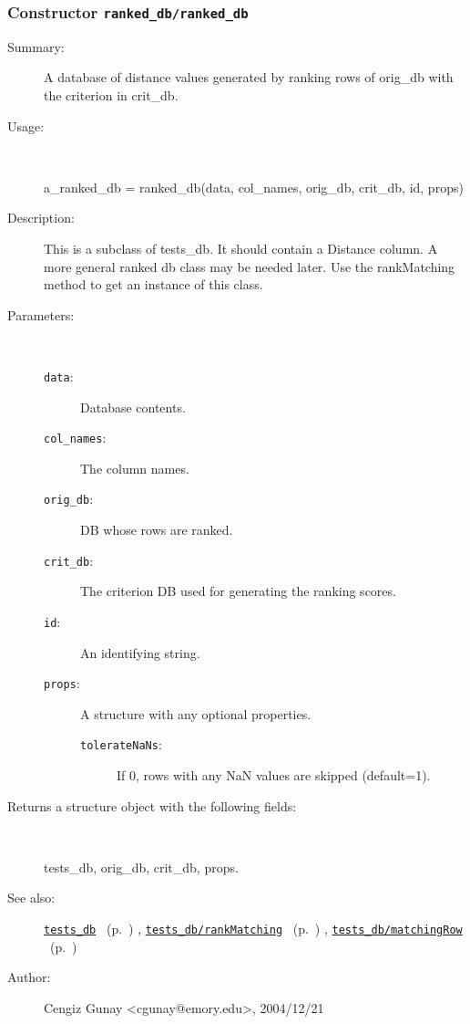 \subsubsection[Constructor \texttt{ranked\_db}]{Constructor \texttt{ranked\_db/ranked\_db}}%
%
\label{ref_ranked_db__ranked_db}%
\hypertarget{ref_ranked_db__ranked_db}{}%
\begin{description}
\item[Summary:]A database of distance values generated by ranking rows of orig\_db with the criterion in crit\_db.
%
\item[Usage:]~%
\begin{lyxcode}%
a\_ranked\_db = ranked\_db(data, col\_names, orig\_db, crit\_db, id, props)
%
\end{lyxcode}%
%
\item[Description:]%
This is a subclass of tests\_db. It should contain a Distance column. A
 more general ranked db class may be needed later. Use the rankMatching method
 to get an instance of this class.
\item[Parameters:]~
\begin{description}%
\item[\texttt{data}:]
 Database contents.
\item[\texttt{col\_names}:]
 The column names.
\item[\texttt{orig\_db}:]
 DB whose rows are ranked.
\item[\texttt{crit\_db}:]
 The criterion DB used for generating the ranking scores.
\item[\texttt{id}:]
 An identifying string.
\item[\texttt{props}:]
 A structure with any optional properties.
\begin{description}%
\item[\texttt{tolerateNaNs}:]
 If 0, rows with any NaN values are skipped (default=1).
\end{description}%
\end{description}%
%
\item[Returns a structure object with the following fields:]~

	tests\_db, orig\_db, crit\_db, props.
%
%
\item[See also:]%
\hyperlink{ref_tests_db}{\texttt{tests\_db}}%
\ (p.~\pageref{ref_tests_db})%
%
, \hyperlink{ref_tests_db__rankMatching}{\texttt{tests\_db/rankMatching}}%
\ (p.~\pageref{ref_tests_db__rankMatching})%
%
, \hyperlink{ref_tests_db__matchingRow}{\texttt{tests\_db/matchingRow}}%
\ (p.~\pageref{ref_tests_db__matchingRow})%
%
%
\item[Author:]%
Cengiz Gunay <cgunay@emory.edu>, 2004/12/21%
\end{description}
\methodline%
